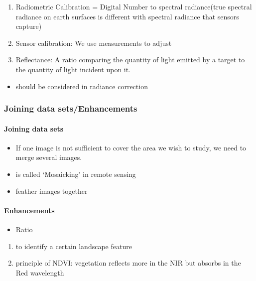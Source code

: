 \documentclass[
  letterpaper,
  DIV=11,
  numbers=noendperiod]{scrreprt}
\let\oldparagraph\paragraph
\renewcommand{\paragraph}[1]{\oldparagraph{#1}\mbox{}}
\providecommand{\tightlist}{%
  \setlength{\itemsep}{0pt}\setlength{\parskip}{0pt}}\usepackage{longtable,booktabs,array}
\begin{document}
\begin{enumerate}
\def\labelenumi{\arabic{enumi}.}
\tightlist
\item
  Radiometric Calibration = Digital Number to spectral radiance(true
  spectral radiance on earth surfaces is different with spectral
  radiance that sensors capture)
\item
  Sensor calibration: We use measurements to adjust
\item
  Reflectance: A ratio comparing the quantity of light emitted by a
  target to the quantity of light incident upon it.
\end{enumerate}

\begin{itemize}
\tightlist
\item
  should be considered in radiance correction
\end{itemize}

\hypertarget{joining-data-setsenhancements}{%
\subsubsection{Joining data
sets/Enhancements}\label{joining-data-setsenhancements}}

\hypertarget{joining-data-sets}{%
\paragraph{Joining data sets}\label{joining-data-sets}}

\begin{itemize}
\tightlist
\item
  If one image is not sufficient to cover the area we wish to study, we
  need to merge several images.
\item
  is called `Mosaicking' in remote sensing
\item
  feather images together
\end{itemize}

\hypertarget{enhancements}{%
\paragraph{Enhancements}\label{enhancements}}

\begin{itemize}
\tightlist
\item
  Ratio
\end{itemize}

\begin{enumerate}
\def\labelenumi{\arabic{enumi}.}
\tightlist
\item
  to identify a certain landscape feature
\item
  principle of NDVI: vegetation reflects more in the NIR but absorbs in
  the Red wavelength
\end{enumerate}
\end{document}
